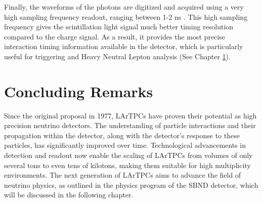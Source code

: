 Finally, the waveforms of the photons are digitized and acquired using a very high sampling frequency readout, ranging between 1-2 ns \cite{sbnd_det}.
This high sampling frequency gives the scintillation light signal much better timing resolution compared to the charge signal.
As a result, it provides the most precise interaction timing information available in the detector, which is particularly useful for triggering and Heavy Neutral Lepton analysis (See Chapter \ref{}).

\section{Concluding Remarks}

Since the original proposal in 1977, LArTPCs have proven their potential as high precision neutrino detectors.
The understanding of particle interactions and their propagation within the detector, along with the detector's response to these particles, has significantly improved over time. 
Technological advancements in detection and readout now enable the scaling of LArTPCs from volumes of only several tons to even tens of kilotons, making them suitable for high multiplicity environments.
The next generation of LArTPCs aims to advance the field of neutrino physics, as outlined in the physics program of the SBND detector, which will be discussed in the following chapter.
